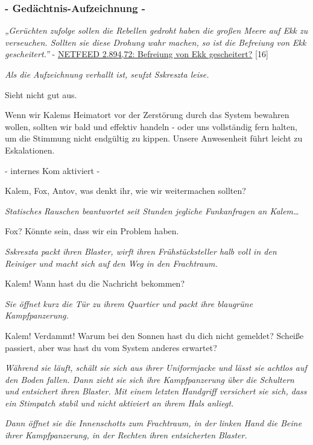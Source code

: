 \documentclass[11pt]{scrartcl}
\begin{document}
\subsubsection{- Gedächtnis-Aufzeichnung -}

\emph{„Gerüchten zufolge sollen die Rebellen gedroht haben die großen
Meere auf Ekk zu verseuchen. Sollten sie diese Drohung wahr machen, so
ist die Befreiung von Ekk gescheitert.''} -
\href{http://1w6.org/deutsch/welten/raumzeit/netfeed-archiv/netfeed-flag-news/local/netfeed-289472-befreiung-von-ekk-gesc}{NETFEED
2.894,72: Befreiung von Ekk gescheitert?} {[}16{]}

\emph{Als die Aufzeichnung verhallt ist, seufzt Sskreszta leise.}

Sieht nicht gut aus.

Wenn wir Kalems Heimatort vor der Zerstörung durch das System bewahren
wollen, sollten wir bald und effektiv handeln - oder uns vollständig
fern halten, um die Stimmung nicht endgültig zu kippen. Unsere
Anwesenheit führt leicht zu Eskalationen.

- internes Kom aktiviert -

Kalem, Fox, Antov, was denkt ihr, wie wir weitermachen sollten?

\emph{Statisches Rauschen beantwortet seit Stunden jegliche Funkanfragen
an Kalem\ldots{}}

Fox? Könnte sein, dass wir ein Problem haben.

\emph{Sskreszta packt ihren Blaster, wirft ihren Frühstücksteller halb
voll in den Reiniger und macht sich auf den Weg in den Frachtraum.}

Kalem! Wann hast du die Nachricht bekommen?

\emph{Sie öffnet kurz die Tür zu ihrem Quartier und packt ihre blaugrüne
Kampfpanzerung.}

Kalem! Verdammt! Warum bei den Sonnen hast du dich nicht gemeldet?
Scheiße passiert, aber was hast du vom System anderes erwartet?

\emph{Während sie läuft, schält sie sich aus ihrer Uniformjacke und
lässt sie achtlos auf den Boden fallen. Dann zieht sie sich ihre
Kampfpanzerung über die Schultern und entsichert ihren Blaster. Mit
einem letzten Handgriff versichert sie sich, dass ein Stimpatch stabil
und nicht aktiviert an ihrem Hals anliegt.}

\emph{Dann öffnet sie die Innenschotts zum Frachtraum, in der linken
Hand die Beine ihrer Kampfpanzerung, in der Rechten ihren entsicherten
Blaster.}
\end{document}
